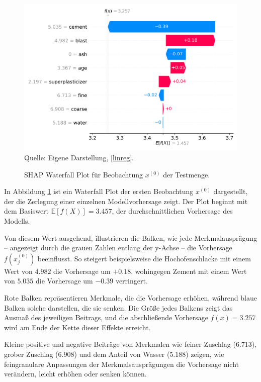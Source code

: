 \begin{figure}[!h]
    \caption{SHAP Waterfall Plot für Beobachtung $x^{(0)}$ der Testmenge.}
    \includegraphics[width=1\textwidth]{../scripts/images/shap_waterfall_plot.png}
    Quelle: Eigene Darstellung, \ref{linreg}.
    \label{pic:shap_waterfall}
\end{figure}

In Abbildung \ref{pic:shap_waterfall} ist ein Waterfall Plot der ersten Beobachtung $x^{(0)}$ dargestellt, 
der die Zerlegung einer einzelnen Modellvorhersage zeigt. Der Plot beginnt mit dem Basiswert $\mathbb{E}[f(X)] = 3.457$, 
der durchschnittlichen Vorhersage des Modells. 

Von diesem Wert ausgehend, illustrieren die Balken, wie jede Merkmalausprägung – 
angezeigt durch die grauen Zahlen entlang der y-Achse – die Vorhersage $f(x_{j}^{(0)})$ beeinflusst. 
So steigert beispielsweise die Hochofenschlacke mit einem Wert von $4.982$ die Vorhersage um $+0.18$, 
wohingegen Zement mit einem Wert von $5.035$ die Vorhersage um $-0.39$ verringert.

Rote Balken repräsentieren Merkmale, die die Vorhersage erhöhen, während blaue Balken solche 
darstellen, die sie senken. Die Größe jedes Balkens zeigt das Ausmaß des jeweiligen Beitrags, 
und die abschließende Vorhersage $f(x) = 3.257$ wird am Ende der Kette dieser Effekte erreicht. 

Kleine positive und negative Beiträge von Merkmalen wie feiner Zuschlag ($6.713$), grober Zuschlag ($6.908$) und dem Anteil von Wasser ($5.188$)
zeigen, wie feingranulare Anpassungen der Merkmalsausprägungen die Vorhersage nicht verändern, leicht erhöhen oder senken können.

